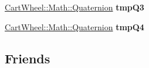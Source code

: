 \begin{DoxyCompactItemize}
\item 
\hypertarget{classCartWheel_1_1Physics_1_1Joint_aa8862410b8ff8ff7adfde4987590ca87}{
\hyperlink{classCartWheel_1_1Math_1_1Quaternion}{CartWheel::Math::Quaternion} {\bfseries tmpQ3}}
\label{classCartWheel_1_1Physics_1_1Joint_aa8862410b8ff8ff7adfde4987590ca87}

\item 
\hypertarget{classCartWheel_1_1Physics_1_1Joint_a3a3d43b99f73602e9f2e84695acd42f8}{
\hyperlink{classCartWheel_1_1Math_1_1Quaternion}{CartWheel::Math::Quaternion} {\bfseries tmpQ4}}
\label{classCartWheel_1_1Physics_1_1Joint_a3a3d43b99f73602e9f2e84695acd42f8}

\end{DoxyCompactItemize}
\subsection*{Friends}
